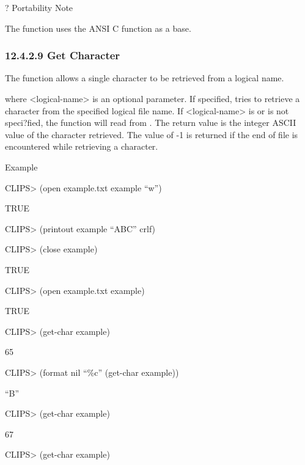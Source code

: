 \documentclass[letterpaper,10pt,english]{sphinxmanual}
\begin{document}
? Portability Note

The  function uses the ANSI C function  as a base.


\subsubsection{12.4.2.9 Get Character}
\label{\detokenize{actions:get-character}}
The  function allows a single character to be retrieved from
a logical name.


\begin{sphinxVerbatim}[commandchars=\\\{\}]
 \PYG{p}{[}\PYG{p}{]}
\end{sphinxVerbatim}

where \textless{}logical-name\textgreater{} is an optional parameter. If specified,
 tries to retrieve a character from the specified logical
file name. If \textless{}logical-name\textgreater{} is  or is not speci?fied, the function
will read from . The return value is the integer ASCII value of
the character retrieved. The value of -1 is returned if the end of file
is encountered while retrieving a character.

Example

CLIPS\textgreater{} (open example.txt example “w”)

TRUE

CLIPS\textgreater{} (printout example “ABC” crlf)

CLIPS\textgreater{} (close example)

TRUE

CLIPS\textgreater{} (open example.txt example)

TRUE

CLIPS\textgreater{} (get-char example)

65

CLIPS\textgreater{} (format nil “\%c” (get-char example))

“B”

CLIPS\textgreater{} (get-char example)

67

CLIPS\textgreater{} (get-char example)
\end{document}
